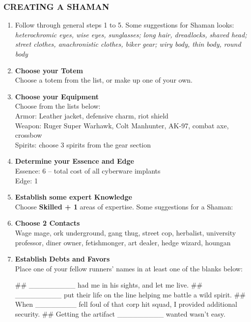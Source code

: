 \subsubsection{CREATING A SHAMAN}
\begin{enumerate}
    \item Follow through general steps 1 to 5. Some suggestions for Shaman looks: \textit{heterochromic eyes, wise eyes, sunglasses; long hair, dreadlocks, shaved head; street clothes, anachronistic clothes, biker gear; wiry body, thin body, round body}
    
    \item \textbf{Choose your Totem} \\
    Choose a totem from the list, or make up one of your own.
    
    \item \textbf{Choose your Equipment} \\
    Choose from the lists below: \\
        Armor: Leather jacket, defensive charm, riot shield \\
        Weapon: Ruger Super Warhawk, Colt Manhunter, AK-97, combat axe, crossbow \\
        Spirits: choose 3 spirits from the gear section
    
    \item \textbf{Determine your Essence and Edge} \\
    Essence: 6 – total cost of all cyberware implants \\
    Edge: 1

    \item \textbf{Establish some expert Knowledge} \\
    Choose \textbf{\textsf{Skilled + 1}} areas of expertise. Some suggestions for a Shaman: \textit{}
    
    \item \textbf{Choose 2 Contacts} \\
    Wage mage, ork underground, gang thug, street cop, herbalist, university professor, diner owner, fetishmonger, art dealer, hedge wizard, houngan
    
    \item \textbf{Establish Debts and Favors} \\
    Place one of your fellow runners’ names in at least one of the blanks below:
        \begin{easylist}
            ## \_\_\_\_\_\_\_\_\_ had me in his sights, and let me live.
            ## \_\_\_\_\_\_\_\_\_ put their life on the line helping me battle a wild spirit.
            ## When \_\_\_\_\_\_\_\_ fell foul of that corp hit squad, I provided additional security.
            ## Getting the artifact \_\_\_\_\_\_\_\_\_ wanted wasn’t easy.
        \end{easylist}
    

\end{enumerate}
